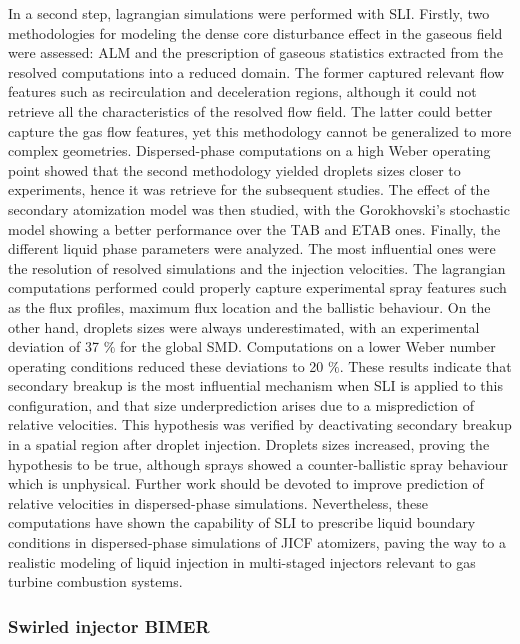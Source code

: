 In a second step, lagrangian simulations were performed with SLI. Firstly, two methodologies for modeling the dense core disturbance effect in the gaseous field were assessed: ALM and the prescription of gaseous statistics extracted from the resolved computations into a reduced domain. The former captured relevant flow features such as recirculation and deceleration regions, although it could not retrieve all the characteristics of the resolved flow field. The latter could better capture the gas flow features, yet this methodology cannot be generalized to more complex geometries. Dispersed-phase computations on a high Weber operating point showed that the second methodology yielded droplets sizes closer to experiments, hence it was retrieve for the subsequent studies. The effect of the secondary atomization model was then studied, with the Gorokhovski’s stochastic model showing a better performance over the TAB and ETAB ones. Finally, the different liquid phase parameters were analyzed. The most influential ones were the resolution of resolved simulations and the injection velocities. The lagrangian computations performed could properly capture experimental spray features such as the flux profiles, maximum flux location and the ballistic behaviour. On the other hand, droplets sizes were always underestimated, with an
experimental deviation of 37 $\%$ for the global SMD. Computations on a lower Weber number operating conditions reduced these deviations to 20 $\%$. These results indicate that secondary breakup is the most influential mechanism when SLI is applied to this configuration, and that size underprediction arises due to a misprediction of relative velocities. This hypothesis was verified by deactivating secondary breakup in a spatial region after droplet injection. Droplets sizes increased, proving the hypothesis to be true, although sprays showed a counter-ballistic spray behaviour which is unphysical. Further work should be devoted to improve prediction of relative velocities in dispersed-phase simulations. Nevertheless, these computations have shown the capability of SLI to prescribe liquid boundary conditions in dispersed-phase simulations of JICF atomizers, paving the way to a realistic modeling of liquid injection in multi-staged injectors relevant to gas turbine combustion systems.


\subsubsection*{Swirled injector BIMER}

